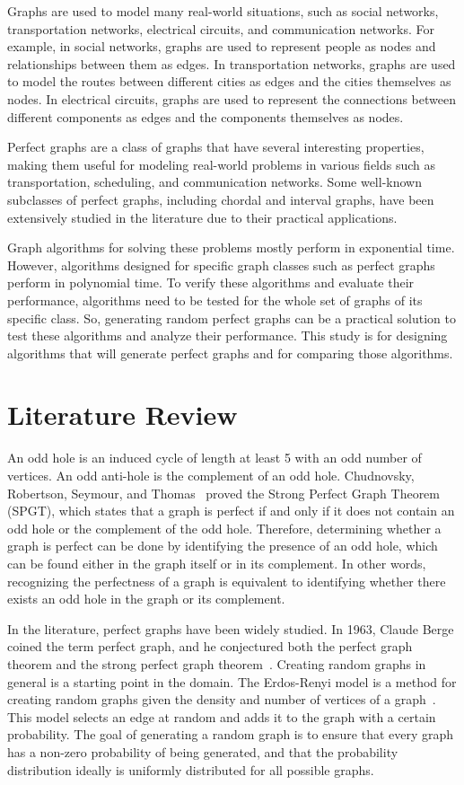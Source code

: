 \documentclass[12pt, oneside, a4paper]{article}
\begin{document}
Graphs are used to model many real-world situations, such as social networks, transportation networks, electrical circuits, and communication networks. For example, in social networks, graphs are used to represent people as nodes and relationships between them as edges. In transportation networks, graphs are used to model the routes between different cities as edges and the cities themselves as nodes. In electrical circuits, graphs are used to represent the connections between different components as edges and the components themselves as nodes.

Perfect graphs are a class of graphs that have several interesting properties, making them useful for modeling real-world problems in various fields such as transportation, scheduling, and communication networks. Some well-known subclasses of perfect graphs, including chordal and interval graphs, have been extensively studied in the literature due to their practical applications.

Graph algorithms for solving these problems mostly perform in exponential time. However, algorithms designed for specific graph classes such as perfect graphs perform in polynomial time. To verify these algorithms and evaluate their performance, algorithms need to be tested for the whole set of graphs of its specific class. So, generating random perfect graphs can be a practical solution to test these algorithms and analyze their performance. This study is for designing algorithms that will generate perfect graphs and for comparing those algorithms.

\section{Literature Review}

An odd hole is an induced cycle of length at least 5 with an odd number of vertices. An odd anti-hole is the complement of an odd hole. Chudnovsky, Robertson, Seymour, and Thomas~\cite{spgt} proved the Strong Perfect Graph Theorem (SPGT), which states that a graph is perfect if and only if it does not contain an odd hole or the complement of the odd hole. Therefore, determining whether a graph is perfect can be done by identifying the presence of an odd hole, which can be found either in the graph itself or in its complement. In other words, recognizing the perfectness of a graph is equivalent to identifying whether there exists an odd hole in the graph or its complement.

In the literature, perfect graphs have been widely studied. In 1963, Claude Berge coined the term perfect graph, and he conjectured both the perfect graph theorem and the strong perfect graph theorem~\cite{berge}. 
Creating random graphs in general is a starting point in the domain. The Erdos-Renyi model is a method for creating random graphs given the density and number of vertices of a graph~\cite{erdos}. This model selects an edge at random and adds it to the graph with a certain probability. The goal of generating a random graph is to ensure that every graph has a non-zero probability of being generated, and that the probability distribution ideally is uniformly distributed for all possible graphs.
 
\end{document}

